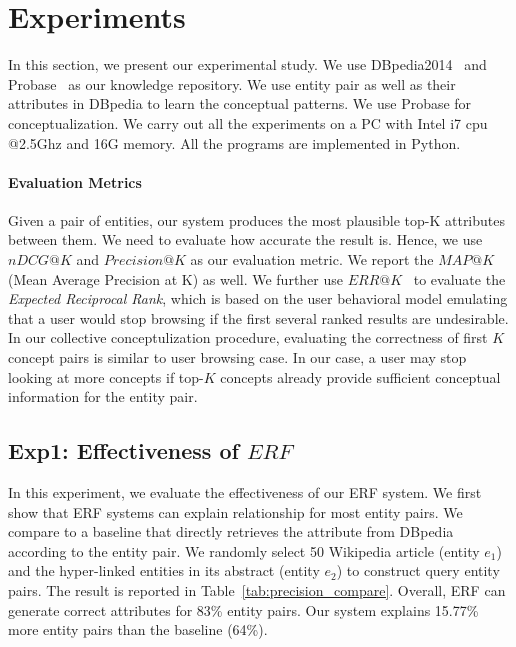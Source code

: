 
\section{Experiments}
\label{sec:exp}

In this section, we present our experimental study.
We use DBpedia2014~\cite{dbpedia} and Probase~\cite{wu2012probase} as our knowledge repository.
We use entity pair as well as their attributes in DBpedia to learn the conceptual patterns.
We use Probase for conceptualization. We carry out all the experiments on a PC with Intel i7 cpu @2.5Ghz and 16G memory. All the programs are implemented in Python.

\paragraph*{Evaluation Metrics}
Given a pair of entities, our system produces the most plausible top-K attributes between them.
We need to evaluate how accurate the result is. 
Hence, we use $nDCG@K$ and $Precision@K$ as our evaluation metric.
We report the $MAP@K$ (Mean Average Precision at K) as well.
We further use $ ERR@K$~\cite{chapelle2009expected} to evaluate the {\it Expected Reciprocal Rank}, which is based on the user behavioral model emulating that a user would stop browsing if the first several ranked results are undesirable. In our collective conceptulization procedure, evaluating the correctness of first $K$ concept pairs is similar to user browsing case. In our case, a user may stop looking at more concepts if top-$K$ concepts already provide sufficient conceptual information for the entity pair.


\subsection{Exp1: Effectiveness of $ERF$}
In this experiment, we evaluate the effectiveness of our ERF system.
We first show that ERF systems can explain relationship for most entity pairs.
We compare to a baseline that directly retrieves the attribute from DBpedia according to the entity pair.
We randomly select 50 Wikipedia article (entity $e_1$) and the hyper-linked entities in its abstract (entity $e_2$)
to construct query entity pairs.
The result is reported in Table~\ref{tab:precision_compare}.
Overall, ERF can generate correct attributes for 83\% entity pairs.
Our system explains 15.77\% more entity pairs than the baseline (64\%).

